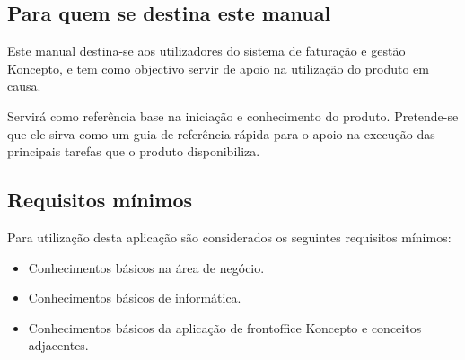 \documentclass[a4paper,11pt,openany]{memoir}
\begin{document}
\vspace*{\fill}

\cleardoublepage

\pagestyle{headings}




\tableofcontents


\mainmatter


%


\subsection{Para quem se destina este manual}

Este manual destina-se aos utilizadores do sistema de faturação e gestão Koncepto,
e  tem como objectivo servir de apoio na utilização do produto em causa.

Servirá como referência base na iniciação e conhecimento do produto. Pretende-se
que ele sirva como um guia de referência rápida para o apoio na execução das
principais tarefas que o produto disponibiliza.



\subsection{Requisitos mínimos}

Para utilização desta aplicação são considerados os seguintes requisitos mínimos:
\begin{itemize}
\item Conhecimentos básicos na área de negócio.
\item Conhecimentos básicos de informática.
\item Conhecimentos básicos da aplicação de frontoffice Koncepto e conceitos adjacentes.
\end{itemize}
\end{document}
